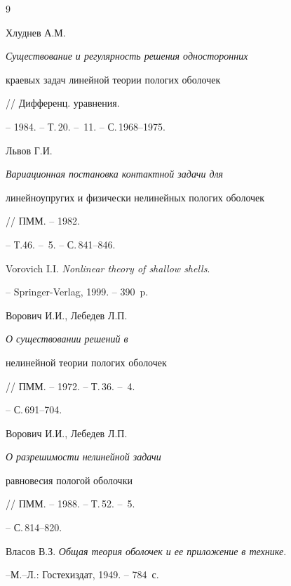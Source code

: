 \begin{thebibliography}{9}







Хлуднев А.М. {\em Существование и регулярность решения односторонних


краевых задач линейной теории пологих оболочек} // Дифференц. уравнения.


-- 1984. -- Т.\,20. -- \No\,11. -- С.\,1968--1975.







Львов Г.И. {\em Вариационная постановка контактной задачи для


линейноупругих и физически нелинейных пологих оболочек} // ПММ. -- 1982.


-- Т.46. -- \No\,5. -- С.\,841--846.







Vorovich I.I. {\em Nonlinear theory of shallow shells}.


-- Springer-Verlag, 1999. -- 390~p.







Ворович И.И., Лебедев Л.П. {\em О существовании решений в


нелинейной теории пологих оболочек} // ПММ. -- 1972. -- Т.\,36. -- \No\,4.


-- С.\,691--704.







Ворович И.И., Лебедев Л.П. {\em О разрешимости нелинейной задачи


равновесия пологой оболочки} // ПММ. -- 1988. -- Т.\,52. -- \No\,5.


-- С.\,814--820.







Власов В.З. {\em Общая теория оболочек и ее приложение в технике}.


--М.--Л.: Гостехиздат, 1949. -- 784~с.








\end{thebibliography}
